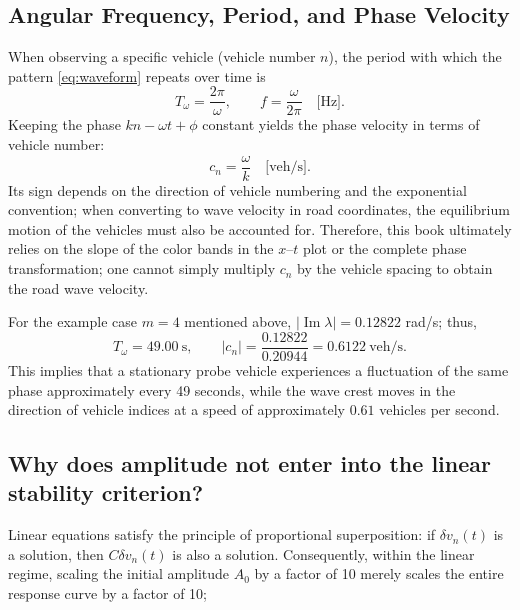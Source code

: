 \documentclass[11pt,a4paper,openany]{book}
\numberwithin{equation}{chapter}
\numberwithin{figure}{chapter}
\numberwithin{table}{chapter}
\begin{document}
\subsection{Angular Frequency, Period, and Phase Velocity}When observing a specific vehicle (vehicle number $n$), the period with which the pattern \eqref{eq:waveform} repeats over time is
\begin{equation}
T_\omega=\frac{2\pi}{\omega},
\qquad
f=\frac{\omega}{2\pi}\quad\text{[Hz]}.
\end{equation}
Keeping the phase $kn-\omega t+\phi$ constant yields the phase velocity in terms of vehicle number:
\begin{equation}
c_n=\frac{\omega}{k}\quad\text{[veh/s]}.
\end{equation}
Its sign depends on the direction of vehicle numbering and the exponential convention; when converting to wave velocity in road coordinates, the equilibrium motion of the vehicles must also be accounted for. Therefore, this book ultimately relies on the slope of the color bands in the $x$–$t$ plot or the complete phase transformation; one cannot simply multiply $c_n$ by the vehicle spacing to obtain the road wave velocity.

For the example case $m=4$ mentioned above, $|\operatorname{Im}\lambda|=0.12822$ rad/s; thus,
\begin{equation}
T_\omega=49.00\ \text{s},
\qquad
|c_n|=\frac{0.12822}{0.20944}=0.6122\ \text{veh/s}.
\end{equation}
This implies that a stationary probe vehicle experiences a fluctuation of the same phase approximately every 49 seconds, while the wave crest moves in the direction of vehicle indices at a speed of approximately $0.61$ vehicles per second.



\subsection{Why does amplitude not enter into the linear stability criterion?}



Linear equations satisfy the principle of proportional superposition: if $\delta v_n(t)$ is a solution, then $C\delta v_n(t)$ is also a solution. Consequently, within the linear regime, scaling the initial amplitude $A_0$ by a factor of 10 merely scales the entire response curve by a factor of 10;
\end{document}
